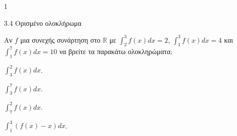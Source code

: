 \begin{ylh}{1}
    \item 3.4 Ορισμένο ολοκλήρωμα
\end{ylh}
Αν $f$ μια συνεχής συνάρτηση στο $\mathbb{R}$ με $\int_{2}^{3} f(x)dx = 2$, $\int_{1}^{3} f(x)dx = 4$ και $\int_{1}^{7} f(x)dx = 10$ να βρείτε τα παρακάτω ολοκληρώματα:
\begin{alist}
    \item $\int_{3}^{2} f(x)dx$. 
    \item $\int_{3}^{7} f(x)dx$. 
    \item $\int_{7}^{2} f(x)dx$. 
    \item $\int_{1}^{3} (f(x)-x)dx$. 
\end{alist}